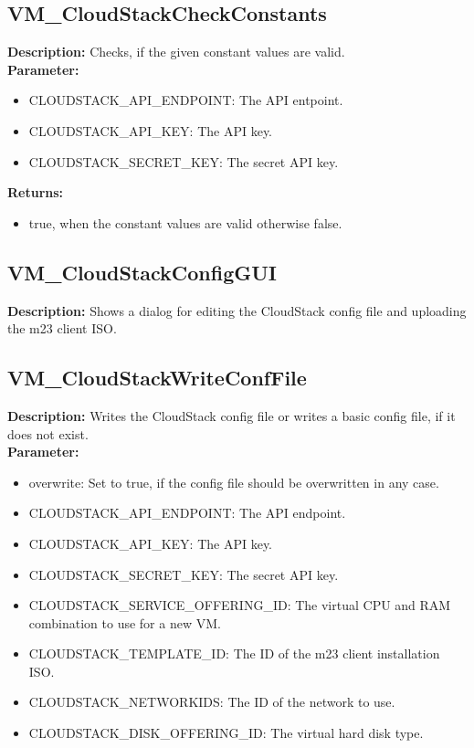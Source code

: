 \subsection{VM\_CloudStackCheckConstants}
\textbf{Description:} Checks, if the given constant values are valid.\\
\textbf{Parameter:}
\begin{itemize}
\item CLOUDSTACK\_API\_ENDPOINT: The API entpoint.
\item CLOUDSTACK\_API\_KEY: The API key.
\item CLOUDSTACK\_SECRET\_KEY: The secret API key.
\end{itemize}
\textbf{Returns:}
\begin{itemize}
\item true, when the constant values are valid otherwise false.
\end{itemize}

\subsection{VM\_CloudStackConfigGUI}
\textbf{Description:} Shows a dialog for editing the CloudStack config file and uploading the m23 client ISO.\\

\subsection{VM\_CloudStackWriteConfFile}
\textbf{Description:} Writes the CloudStack config file or writes a basic config file, if it does not exist.\\
\textbf{Parameter:}
\begin{itemize}
\item overwrite: Set to true, if the config file should be overwritten in any case.
\item CLOUDSTACK\_API\_ENDPOINT: The API endpoint.
\item CLOUDSTACK\_API\_KEY: The API key.
\item CLOUDSTACK\_SECRET\_KEY: The secret API key.
\item CLOUDSTACK\_SERVICE\_OFFERING\_ID: The virtual CPU and RAM combination to use for a new VM.
\item CLOUDSTACK\_TEMPLATE\_ID: The ID of the m23 client installation ISO.
\item CLOUDSTACK\_NETWORKIDS: The ID of the network to use.
\item CLOUDSTACK\_DISK\_OFFERING\_ID: The virtual hard disk type.
\end{itemize}

